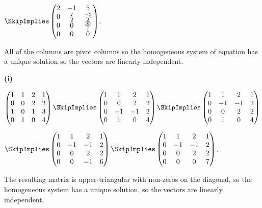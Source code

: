 \documentclass[oneside,12pt]{amsart}
\begin{document}
$
\SkipImplies
\begin{pmatrix}
2 & -1 & 5 \\
0 & \frac{7}{2} & \frac{-3}{2} \\
0 & 0 & \frac{33}{7} \\
0 & 0 & 0
\end{pmatrix}
$.

All of the columns are pivot columns so the homogeneous system of equation has
a unique solution so the vectors are linearly independent.

\bigskip

\textbf{(i)}

$
\begin{pmatrix}
1 & 1 & 2 & 1 \\
0 & 0 & 2 & 2 \\
1 & 0 & 1 & 3 \\
0 & 1 & 0 & 4
\end{pmatrix}
\SkipImplies
\begin{pmatrix}
1 & 1 & 2 & 1 \\
0 & 0 & 2 & 2 \\
0 & -1 & -1 & 2 \\
0 & 1 & 0 & 4
\end{pmatrix}
\SkipImplies
\begin{pmatrix}
1 & 1 & 2 & 1 \\
0 & -1 & -1 & 2 \\
0 & 0 & 2 & 2 \\
0 & 1 & 0 & 4
\end{pmatrix}
$

$
\SkipImplies
\begin{pmatrix}
1 & 1 & 2 & 1 \\
0 & -1 & -1 & 2 \\
0 & 0 & 2 & 2 \\
0 & 0 & -1 & 6
\end{pmatrix}
\SkipImplies
\begin{pmatrix}
1 & 1 & 2 & 1 \\
0 & -1 & -1 & 2 \\
0 & 0 & 2 & 2 \\
0 & 0 & 0 & 7
\end{pmatrix}
$.

The resulting matrix is upper-triangular with non-zeros on the diagonal, so
the homogeneous system has a unique solution, so the vectors are linearly
independent.
\end{document}
